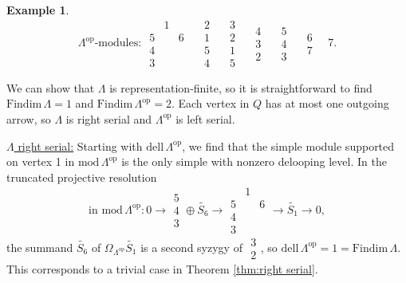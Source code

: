 \documentclass{conm-p-l}
\newcommand{\Findim}{\mathrm{Findim}\,}
\newcommand{\dell}{\mathrm{dell}\,}
\renewcommand{\dell}{\mathrm{dell}\,}
\newcommand{\op}{\mathrm{op}}
\renewcommand{\mod}{\mathrm{mod}\,}
\theoremstyle{definition}
\newtheorem{example}[theorem]{Example}
\theoremstyle{remark}
\numberwithin{equation}{section}
\begin{document}
\begin{example}
\[\text{$\Lambda^{\op}$-modules: } \begin{matrix} {} & 1 & {} \\ 5 & {} & 6 \\ 4 & {} & {} \\ 3 & {} & {} \end{matrix} \quad \begin{matrix} 2 \\ 1 \\ 5 \\ 4 \end{matrix} \quad \begin{matrix} 3 \\ 2 \\ 1 \\ 5 \end{matrix} \quad \begin{matrix} 4 \\ 3 \\ 2 \end{matrix} \quad \begin{matrix} 5 \\ 4 \\ 3 \end{matrix} \quad \begin{matrix} 6 \\ 7 \end{matrix} \quad 7.
\]

We can show that $\Lambda$ is representation-finite, so it is straightforward to find $\Findim\Lambda=1$ and $\Findim\Lambda^{\op}=2$. Each vertex in $Q$ has at most one outgoing arrow, so $\Lambda$ is right serial and $\Lambda^{\op}$ is left serial. 

\underline{$\Lambda$ right serial:} Starting with $\dell\Lambda^{\op}$, we find that 
the simple module supported on vertex 1 in $\mod\Lambda^{\op}$ is the only simple with nonzero delooping level. In the truncated projective resolution
\[
\text{in } \mod\Lambda^{\op}: 0 \to \begin{matrix} 5 \\ 4 \\ 3 \end{matrix} \oplus \widetilde{S_6} \to \begin{matrix} {} & 1 & {} \\ 5 & {} & 6 \\ 4 & {} & {} \\ 3 & {} & {} \end{matrix} \to \widetilde{S_1} \to 0,
\]
the summand $\widetilde{S_6}$ of $\Omega_{\Lambda^{\op}} \widetilde{S_1}$ is a second syzygy of $\begin{matrix} 3 \\ 2 \end{matrix}$, so $\dell\Lambda^{\op}=1=\Findim\Lambda$. This corresponds to a trivial case in Theorem \ref{thm:right serial}.


\end{example}
\end{document}
